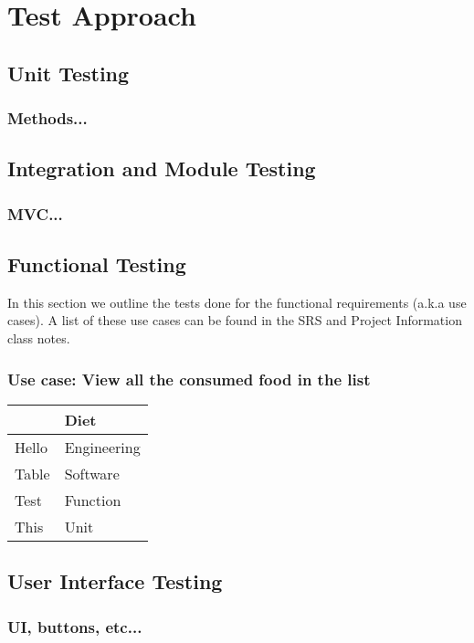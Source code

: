 \documentclass{scrreprt}
\begin{document}
    \chapter{Test Approach}

    \section{Unit Testing}

    \subsection{Methods...}

    \section{Integration and Module Testing}

    \subsection{MVC...}

    \section{Functional Testing}

	In this section we outline the tests done for the functional requirements (a.k.a use cases). A list of these use cases can be found in the SRS and Project 			Information class notes.
	
	\subsection{Use case: View all the consumed food in the list}

\bgroup
\def\arraystretch{1.5}
	\begin{tabular}{|l|l|}
\hline
	\hspace{5cm} & Diet \\
\hline
	 Hello & Engineering \\ [4ex]
\hline
	Table & Software \\
\hline
	Test & Function \\
\hline
	This & Unit \\
\hline
\end{tabular}


    \section{User Interface Testing}

    \subsection{UI, buttons, etc...}
\end{document}
